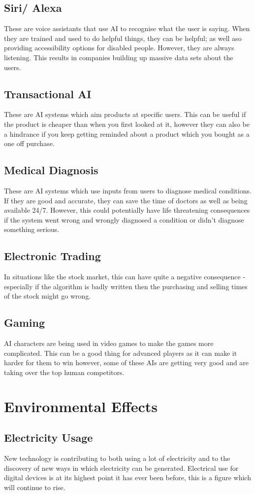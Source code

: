 \documentclass[a4paper,11pt, twocolumn]{article}
\begin{document}
\subsection{Siri/ Alexa}
These are voice assistants that use AI to recognise what the user is saying. When they are trained and used to do helpful things, they can be helpful; as well aso providing accessibility options for disabled people. However, they are always listening. This results in companies building up massive data sets about the users.
\subsection{Transactional AI}
These are AI systems which aim products at specific users. This can be useful if the product is cheaper than when you first looked at it, however they can also be a hindrance if you keep getting reminded about a product which you bought as a one off purchase. 
\subsection{Medical Diagnosis}
These are AI systems which use inputs from users to diagnose medical conditions. If they are good and accurate, they can save the time of doctors as well as being available 24/7. However, this could potentially have life threatening consequences if the system went wrong and wrongly diagnosed a condition or didn't diagnose something serious.
\subsection{Electronic Trading}
In situations like the stock market, this can have quite a negative consequence - especially if the algorithm is badly written then the purchasing and selling times of the stock might go wrong.
\subsection{Gaming}
AI characters are being used in video games to make the games more complicated. This can be a good thing for advanced players as it can make it harder for them to win however, some of these AIs are getting very good and are taking over the top human competitors.

\section{Environmental Effects}
\subsection{Electricity Usage}
New technology is contributing to both using a lot of electricity and to the discovery of new ways in which electricity can be generated. Electrical use for digital devices is at its highest point it has ever been before, this is a figure which will continue to rise.
\end{document}
